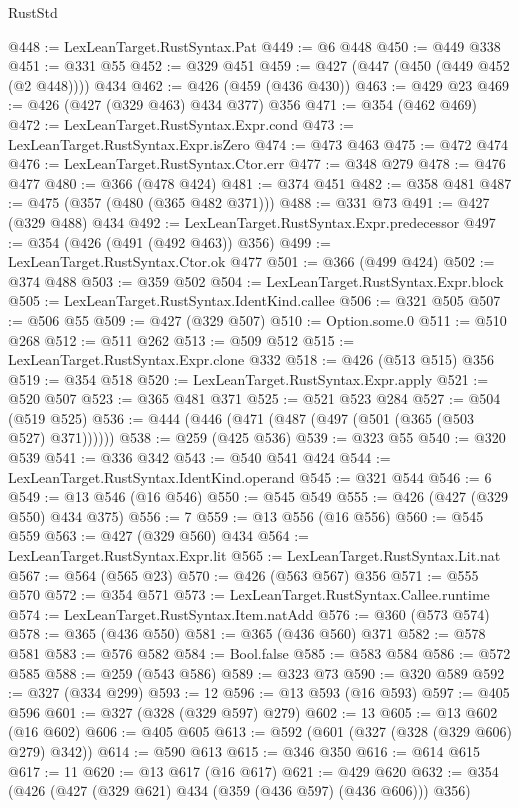\begin{lexlean}{RustStd}
\begin{coremodule}
@448 := LexLeanTarget.RustSyntax.Pat
@449 := @6 @448
@450 := @449 @338
@451 := @331 @55
@452 := @329 @451
@459 := @427 (@447 (@450 (@449 @452 (@2 @448)))) @434
@462 := @426 (@459 (@436 @430))
@463 := @429 @23
@469 := @426 (@427 (@329 @463) @434 @377) @356
@471 := @354 (@462 @469)
@472 := LexLeanTarget.RustSyntax.Expr.cond
@473 := LexLeanTarget.RustSyntax.Expr.isZero
@474 := @473 @463
@475 := @472 @474
@476 := LexLeanTarget.RustSyntax.Ctor.err
@477 := @348 @279
@478 := @476 @477
@480 := @366 (@478 @424)
@481 := @374 @451
@482 := @358 @481
@487 := @475 (@357 (@480 (@365 @482 @371)))
@488 := @331 @73
@491 := @427 (@329 @488) @434
@492 := LexLeanTarget.RustSyntax.Expr.predecessor
@497 := @354 (@426 (@491 (@492 @463)) @356)
@499 := LexLeanTarget.RustSyntax.Ctor.ok @477
@501 := @366 (@499 @424)
@502 := @374 @488
@503 := @359 @502
@504 := LexLeanTarget.RustSyntax.Expr.block
@505 := LexLeanTarget.RustSyntax.IdentKind.callee
@506 := @321 @505
@507 := @506 @55
@509 := @427 (@329 @507)
@510 := Option.some.{0}
@511 := @510 @268
@512 := @511 @262
@513 := @509 @512
@515 := LexLeanTarget.RustSyntax.Expr.clone @332
@518 := @426 (@513 @515) @356
@519 := @354 @518
@520 := LexLeanTarget.RustSyntax.Expr.apply
@521 := @520 @507
@523 := @365 @481 @371
@525 := @521 @523 @284
@527 := @504 (@519 @525)
@536 := @444 (@446 (@471 (@487 (@497 (@501 (@365 (@503 @527) @371))))))
@538 := @259 (@425 @536)
@539 := @323 @55
@540 := @320 @539
@541 := @336 @342
@543 := @540 @541 @424
@544 := LexLeanTarget.RustSyntax.IdentKind.operand
@545 := @321 @544
@546 := 6
@549 := @13 @546 (@16 @546)
@550 := @545 @549
@555 := @426 (@427 (@329 @550) @434 @375)
@556 := 7
@559 := @13 @556 (@16 @556)
@560 := @545 @559
@563 := @427 (@329 @560) @434
@564 := LexLeanTarget.RustSyntax.Expr.lit
@565 := LexLeanTarget.RustSyntax.Lit.nat
@567 := @564 (@565 @23)
@570 := @426 (@563 @567) @356
@571 := @555 @570
@572 := @354 @571
@573 := LexLeanTarget.RustSyntax.Callee.runtime
@574 := LexLeanTarget.RustSyntax.Item.natAdd
@576 := @360 (@573 @574)
@578 := @365 (@436 @550)
@581 := @365 (@436 @560) @371
@582 := @578 @581
@583 := @576 @582
@584 := Bool.false
@585 := @583 @584
@586 := @572 @585
@588 := @259 (@543 @586)
@589 := @323 @73
@590 := @320 @589
@592 := @327 (@334 @299)
@593 := 12
@596 := @13 @593 (@16 @593)
@597 := @405 @596
@601 := @327 (@328 (@329 @597) @279)
@602 := 13
@605 := @13 @602 (@16 @602)
@606 := @405 @605
@613 := @592 (@601 (@327 (@328 (@329 @606) @279) @342))
@614 := @590 @613
@615 := @346 @350
@616 := @614 @615
@617 := 11
@620 := @13 @617 (@16 @617)
@621 := @429 @620
@632 := @354 (@426 (@427 (@329 @621) @434 (@359 (@436 @597) (@436 @606))) @356)

\end{coremodule}
\end{lexlean}
